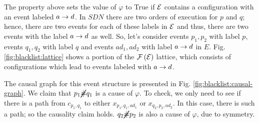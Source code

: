 \begin{exmp}
The property above sets the value of $\varphi$ to True if $\mathcal{E}$ 
contains a configuration with an event labeled $a \rightarrow d$.
In $SDN$ there are two orders of execution for $p$ and $q$; hence,
there are two events for each of these labels in $\mathcal{E}$ 
and thus, there are two events with the label $a \rightarrow d$ as well.
So, let's consider events $p_1,p_2$ with label $p$,
events $q_1,q_2$ with label $q$ and events $ad_1,ad_2$ 
with label $a \rightarrow d$ in $E$. Fig. \ref{fig:blacklist:lattice}
shows a portion of the $\mathcal{F} \left( \mathcal{E} \right)$ lattice, which consists of configurations
which lead to events labeled with $a\rightarrow d$.





The causal graph for this event structure is presented in Fig. \ref{fig:blacklist:causal-graph}.
We claim that $p_1 \cancel{\#} q_1$ is a cause of $\varphi$. To check, we only need to see
if there is a path from $c_{p_1,q_1}$ to either $x_{p_1,q_1,ad_1}$ or $x_{q_2,p_2,ad_2}$.
In this case, there is such a path; so the causality claim holds.
$q_2 \cancel{\#} p_2$ is also a cause of $\varphi$, due to symmetry.
\end{exmp}
